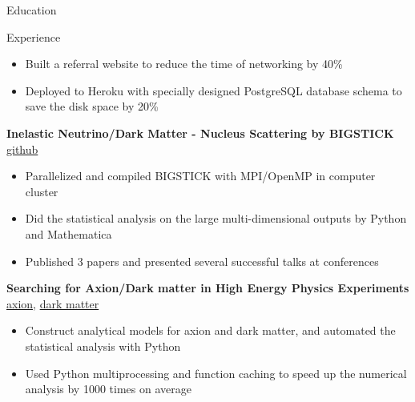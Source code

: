 \documentclass{resume}
\begin{document}
\begin{rSection}{Education}
\begin{rSection}{Experience}
\begin{itemize}
        \itemsep -3pt {}
        \item Built a referral website to reduce the time of networking by 40\%
        \item Deployed to Heroku with specially designed PostgreSQL database schema to save the disk space by 20\%
        \end{itemize}
    \item \textbf{Inelastic Neutrino/Dark Matter - Nucleus Scattering by BIGSTICK} \hfill {\href{https://github.com/noctildon/Inelastic}{github}}
        \begin{itemize}
        \itemsep -3pt {}
        \item Parallelized and compiled BIGSTICK with MPI/OpenMP in computer cluster
        \item Did the statistical analysis on the large multi-dimensional outputs by Python and Mathematica
        \item Published 3 papers and presented several successful talks at conferences
        \end{itemize}
    \item \textbf{Searching for Axion/Dark matter in High Energy Physics Experiments} \hfill {\href{https://github.com/noctildon/alplib}{axion}}, {\href{https://github.com/noctildon/lightDM}{dark matter}}
        \begin{itemize}
        \itemsep -3pt {}
        \item Construct analytical models for axion and dark matter, and automated the statistical analysis with Python
        \item Used Python multiprocessing and function caching to speed up the numerical analysis by 1000 times on average
        \end{itemize}
\end{rSection}



\end{rSection}
\end{document}
